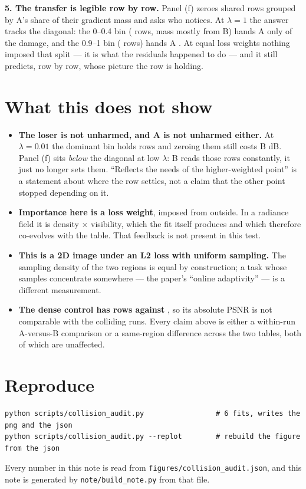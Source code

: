 \documentclass[11pt,a4paper]{article}
\begin{document}
\textbf{5. The transfer is legible row by row.} Panel (f) zeroes shared rows grouped
by A's share of their gradient mass and asks who notices. At $\lambda=1$ the answer
tracks the diagonal: the 0--0.4 bin (\PFONELOWN{} rows, mass mostly from B) hands A
only \PFONELOW{} of the damage, and the 0.9--1 bin (\PFONEHIGHN{} rows) hands A
\PFONEHIGH{}. At equal loss weights nothing imposed that split --- it is what the
residuals happened to do --- and it still predicts, row by row, whose picture the
row is holding.

\section*{What this does not show}

\begin{itemize}\itemsep2pt
\item \textbf{The loser is not unharmed, and A is not unharmed either.} At
$\lambda=0.01$ the dominant bin holds \PFHUNHIGHN{} rows and zeroing them still costs
B \PFHUNHIGHB{} dB. Panel (f) sits \emph{below} the diagonal at low $\lambda$: B
reads those rows constantly, it just no longer sets them. ``Reflects the needs of
the higher-weighted point'' is a statement about where the row settles, not a claim
that the other point stopped depending on it.
\item \textbf{Importance here is a loss weight}, imposed from outside. In a radiance
field it is density $\times$ visibility, which the fit itself produces and which
therefore co-evolves with the table. That feedback is not present in this test.
\item \textbf{This is a 2D image under an L2 loss with uniform sampling.} The
sampling density of the two regions is equal by construction; a task whose samples
concentrate somewhere --- the paper's ``online adaptivity'' --- is a different
measurement.
\item \textbf{The dense control has \NENTDENSE{} rows against \NENTSMALL{}}, so its
absolute PSNR is not comparable with the colliding runs. Every claim above is
either a within-run A-versus-B comparison or a same-region difference across the two
tables, both of which are unaffected.
\end{itemize}

\section*{Reproduce}

\begin{verbatim}
python scripts/collision_audit.py                 # 6 fits, writes the png and the json
python scripts/collision_audit.py --replot        # rebuild the figure from the json
\end{verbatim}

Every number in this note is read from \texttt{figures/collision\_audit.json}, and
this note is generated by \texttt{note/build\_note.py} from that file.
\end{document}
